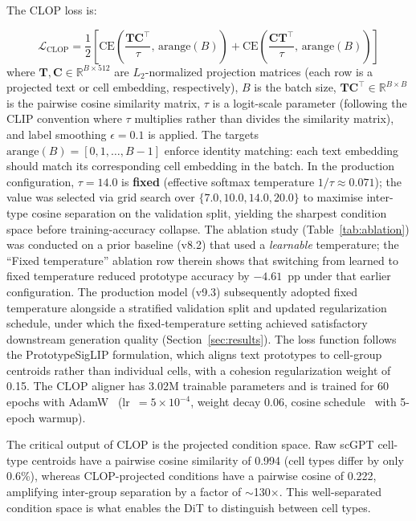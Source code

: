 \documentclass[preprint,12pt]{elsarticle}
\begin{document}
The CLOP loss is:

\begin{equation}
\mathcal{L}_\text{CLOP} = \frac{1}{2}\left[\text{CE}\!\left(\frac{\mathbf{T}\mathbf{C}^\top}{\tau},\,\text{arange}(B)\right) + \text{CE}\!\left(\frac{\mathbf{C}\mathbf{T}^\top}{\tau},\,\text{arange}(B)\right)\right]
\label{eq:clop}
\end{equation}
where $\mathbf{T}, \mathbf{C} \in \mathbb{R}^{B \times 512}$ are $L_2$-normalized projection matrices (each row is a projected text or cell embedding, respectively), $B$ is the batch size, $\mathbf{T}\mathbf{C}^\top \in \mathbb{R}^{B \times B}$ is the pairwise cosine similarity matrix, $\tau$ is a logit-scale parameter (following the CLIP convention where $\tau$ multiplies rather than divides the similarity matrix), and label smoothing $\epsilon = 0.1$ is applied. The targets $\text{arange}(B) = [0, 1, \ldots, B{-}1]$ enforce identity matching: each text embedding should match its corresponding cell embedding in the batch. In the production configuration, $\tau = 14.0$ is \textbf{fixed} (effective softmax temperature $1/\tau \approx 0.071$); the value was selected via grid search over $\{7.0, 10.0, 14.0, 20.0\}$ to maximise inter-type cosine separation on the validation split, yielding the sharpest condition space before training-accuracy collapse. The ablation study (Table~\ref{tab:ablation}) was conducted on a prior baseline (v8.2) that used a \emph{learnable} temperature; the ``Fixed temperature'' ablation row therein shows that switching from learned to fixed temperature reduced prototype accuracy by $-4.61$~pp under that earlier configuration. The production model (v9.3) subsequently adopted fixed temperature alongside a stratified validation split and updated regularization schedule, under which the fixed-temperature setting achieved satisfactory downstream generation quality (Section~\ref{sec:results}). The loss function follows the PrototypeSigLIP formulation, which aligns text prototypes to cell-group centroids rather than individual cells, with a cohesion regularization weight of 0.15. The CLOP aligner has 3.02M trainable parameters and is trained for 60 epochs with AdamW~\cite{ref-adamw} (lr~$= 5 \times 10^{-4}$, weight decay 0.06, cosine schedule~\cite{ref-cosine-schedule} with 5-epoch warmup).

The critical output of CLOP is the projected condition space. Raw scGPT cell-type centroids have a pairwise cosine similarity of 0.994 (cell types differ by only 0.6\%), whereas CLOP-projected conditions have a pairwise cosine of 0.222, amplifying inter-group separation by a factor of $\sim$130$\times$. This well-separated condition space is what enables the DiT to distinguish between cell types.
\end{document}
